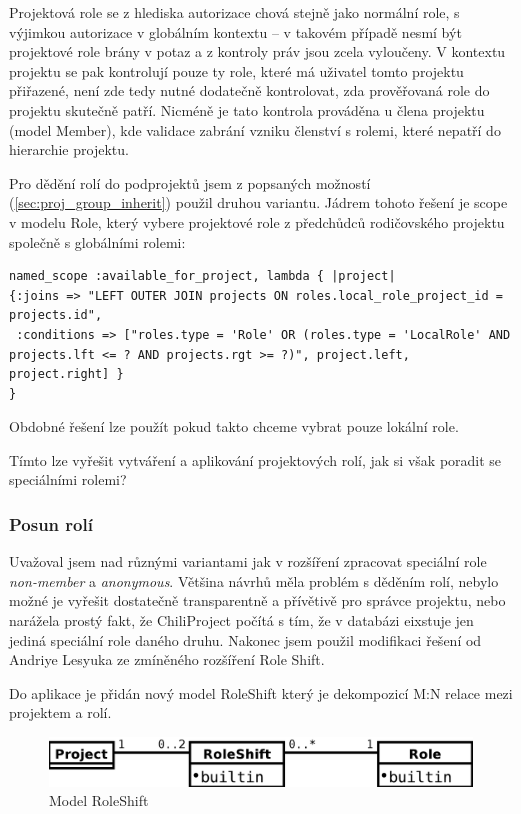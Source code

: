 \documentclass[thesis=B,czech]{FITthesis}[2012/05/02]
\begin{document}
Projektová role se z hlediska autorizace chová stejně jako normální
role, s výjimkou autorizace v globálním kontextu -- v takovém případě
nesmí být projektové role brány v potaz a z kontroly práv jsou zcela
vyloučeny. V kontextu projektu se pak kontrolují pouze ty role, které má
uživatel tomto projektu přiřazené, není zde tedy nutné dodatečně
kontrolovat, zda prověřovaná role do projektu skutečně patří. Nicméně je
tato kontrola prováděna u člena projektu (model Member), kde validace
zabrání vzniku členství s rolemi, které nepatří do hierarchie projektu.

Pro dědění rolí do podprojektů jsem z popsaných možností
(\ref{sec:proj_group_inherit}) použil druhou variantu. Jádrem tohoto
řešení je \gls{scope} v modelu Role, který vybere projektové role
z předchůdců rodičovského projektu společně s globálními rolemi:

\begin{lstlisting}
named_scope :available_for_project, lambda { |project|
{:joins => "LEFT OUTER JOIN projects ON roles.local_role_project_id = projects.id",
 :conditions => ["roles.type = 'Role' OR (roles.type = 'LocalRole' AND projects.lft <= ? AND projects.rgt >= ?)", project.left, project.right] }
}
\end{lstlisting}
Obdobné řešení lze použít pokud takto chceme vybrat pouze lokální role.

Tímto lze vyřešit vytváření a aplikování projektových rolí, jak si však
poradit se speciálními rolemi?

\subsubsection{Posun rolí}

Uvažoval jsem nad různými variantami jak v rozšíření zpracovat speciální
role \emph{non-member} a \emph{anonymous}. Většina návrhů měla problém
s děděním rolí, nebylo možné je vyřešit dostatečně transparentně a
přívětivě pro správce projektu, nebo narážela prostý fakt, že
ChiliProject počítá s tím, že v databázi eixstuje jen jediná speciální
role daného druhu. Nakonec jsem použil modifikaci řešení od Andriye
Lesyuka ze zmíněného rozšíření Role Shift.

Do aplikace je přidán nový model RoleShift který je dekompozicí M:N
relace mezi projektem a rolí.

\begin{figure}[htbp]
\centering
\includegraphics[width=1\textwidth]{role-er2.pdf}
\caption{Model RoleShift}
\end{figure}
\end{document}
